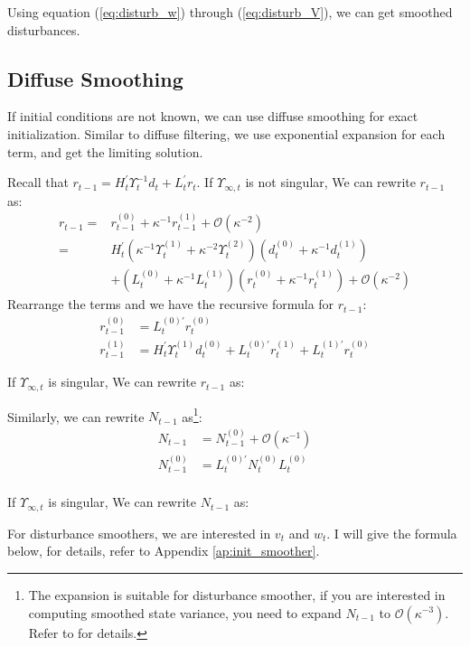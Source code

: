 \documentclass[12pt]{article}
\numberwithin{equation}{section}
\begin{document}
Using equation (\ref{eq:disturb_w}) through (\ref{eq:disturb_V}), we can get smoothed disturbances.

\subsection{Diffuse Smoothing}
If initial conditions are not known, we can use diffuse smoothing for exact initialization. Similar to diffuse filtering, we use exponential expansion for each term, and get the limiting solution.  

Recall that $r_{t-1} = H_t^{'}\Upsilon_t^{-1}d_t + L_t^{'}r_t$. If $\Upsilon_{\infty,t}$ is not singular, We can rewrite $r_{t-1}$ as:
\begin{align*}
    r_{t-1} =& r_{t-1}^{(0)} + \kappa^{-1}r_{t-1}^{(1)}+\mathcal{O}(\kappa^{-2}) \\
    =& H_t^{'}(\kappa^{-1}\Upsilon_t^{(1)}+\kappa^{-2}\Upsilon_{t}^{(2)})(d_t^{(0)} + \kappa^{-1}d_t^{(1)}) \\
    &+ (L_t^{(0)} + \kappa^{-1}L_t^{(1)})(r_t^{(0)}+\kappa^{-1}r_t^{(1)}) + \mathcal{O}(\kappa^{-2})
\end{align*}
Rearrange the terms and we have the recursive formula for $r_{t-1}$:
\begin{align*}
    r_{t-1}^{(0)} &= L_t^{(0)'}r_t^{(0)} \\
    r_{t-1}^{(1)} &= H_t^{'}\Upsilon_t^{(1)}d_t^{(0)} + L_t^{(0)'}r_t^{(1)} + L_t^{(1)'}r_t^{(0)}
\end{align*}

If $\Upsilon_{\infty,t}$ is singular, We can rewrite $r_{t-1}$ as:


Similarly, we can rewrite $N_{t-1}$ as\footnote{The expansion is suitable for disturbance smoother, if you are interested in computing smoothed  state variance, you need to expand $N_{t-1}$ to $\mathcal{O}(\kappa^{-3})$. Refer to \cite{durbin_koopman_2003} for details.}:
\begin{align*}
    N_{t-1} &= N_{t-1}^{(0)} + \mathcal{O}(\kappa^{-1}) \\
    N_{t-1}^{(0)} &= L_t^{(0)'}N_t^{(0)}L_t^{(0)} \\
\end{align*}

If $\Upsilon_{\infty,t}$ is singular, We can rewrite $N_{t-1}$ as:

For disturbance smoothers, we are interested in $v_t$ and $w_t$. I will give the formula below, for details, refer to Appendix \ref{ap:init_smoother}.
\end{document}
